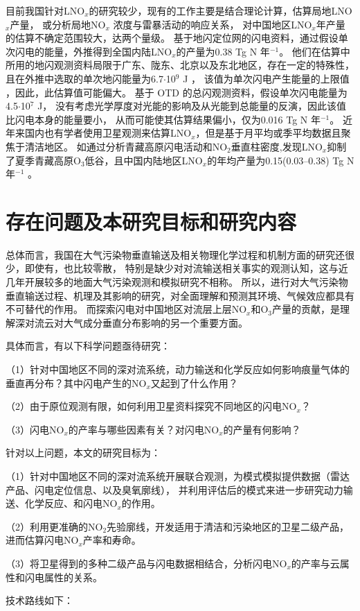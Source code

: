目前我国针对LNO$_x$的研究较少，现有的工作主要是结合理论计算，估算局地LNO$_x$产量，
或分析局地NO$_x$ 浓度与雷暴活动的响应关系\citep{DuJian.2002,ZhangYiJun.2002,ZhouYunJun.2002}，
对中国地区LNO$_x$年产量的估算不确定范围较大，达两个量级。
\citet{ZhouYunJun.2004}基于地闪定位网的闪电资料，通过假设单次闪电的能量，外推得到全国内陆LNO$_x$的产量为0.38 Tg N 年$^{-1}$。
他们在估算中所用的地闪观测资料局限于广东、陇东、北京以及东北地区，存在一定的特殊性，
且在外推中选取的单次地闪能量为6.7$\cdot$10$^9$ J \citep{Price.1997a,Price.1997b}，
该值为单次闪电产生能量的上限值 \citep{Wang.1998}，因此，此估算值可能偏大。
\citet{SunAnPing.2004}基于 OTD 的总闪观测资料，假设单次闪电能量为4.5$\cdot$10$^7$ J，
没有考虑光学厚度对光能的影响及从光能到总能量的反演，因此该值比闪电本身的能量要小，
从而可能使其估算结果偏小，仅为0.016 Tg N 年$^{-1}$。
近年来国内也有学者使用卫星观测来估算LNO$_x$，但是基于月平均或季平均数据且聚焦于清洁地区。
如通过分析青藏高原闪电活动和NO$_2$垂直柱密度,发现LNO$_x$抑制了夏季青藏高原O$_3$低谷，且中国内陆地区LNO$_x$的年均产量为0.15(0.03--0.38) Tg N 年$^{-1}$ \citep{JuXiaoYu.2015,Guo.2017,GuoFengXia.2019,Li.2022}。





\section{存在问题及本研究目标和研究内容}

总体而言，我国在大气污染物垂直输送及相关物理化学过程和机制方面的研究还很少，即使有，也比较零散，
特别是缺少对对流输送相关事实的观测认知，这与近几年开展较多的地面大气污染观测和模拟研究不相称。
所以，进行对大气污染物垂直输送过程、机理及其影响的研究，对全面理解和预测其环境、气候效应都具有不可替代的作用。
而探索闪电对中国地区对流层上层NO$_x$和O$_3$产量的贡献，是理解深对流云对大气成分垂直分布影响的另一个重要方面。

具体而言，有以下科学问题亟待研究：

（1）针对中国地区不同的深对流系统，动力输送和化学反应如何影响痕量气体的垂直再分布？其中闪电产生的NO$_x$又起到了什么作用？

（2）由于原位观测有限，如何利用卫星资料探究不同地区的闪电NO$_x$？

（3）闪电NO$_x$的产率与哪些因素有关？对闪电NO$_x$的产量有何影响？

针对以上问题，本文的研究目标为：

（1）针对中国地区不同的深对流系统开展联合观测，为模式模拟提供数据（雷达产品、闪电定位信息、以及臭氧廓线），
并利用评估后的模式来进一步研究动力输送、化学反应、和闪电NO$_x$的作用。

（2）利用更准确的NO$_2$先验廓线，开发适用于清洁和污染地区的卫星二级产品，进而估算闪电NO$_x$产率和寿命。

（3）将卫星得到的多种二级产品与闪电数据相结合，分析闪电NO$_x$的产率与云属性和闪电属性的关系。

技术路线如下：

